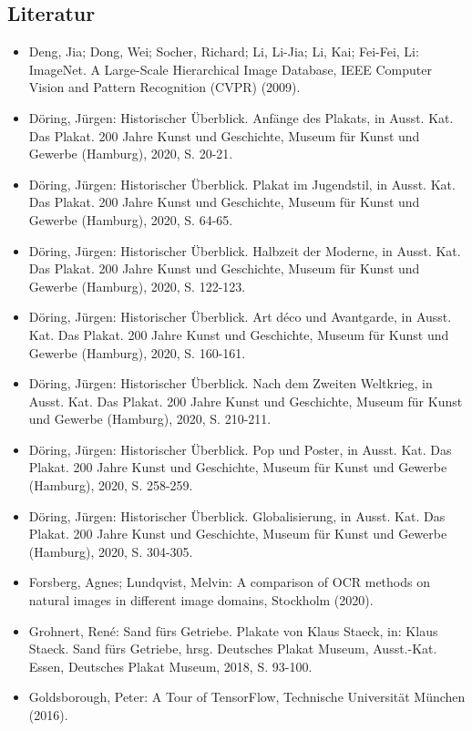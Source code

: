 \documentclass[a4paper,12pt,ngerman]{article}
\begin{document}
\subsection{Literatur}

\begin{itemize}
\item Deng, Jia; Dong, Wei; Socher, Richard; Li, Li-Jia; Li, Kai; Fei-Fei, Li: ImageNet. A Large-Scale Hierarchical Image Database, IEEE Computer Vision and Pattern Recognition (CVPR) (2009).
\item Döring, Jürgen: Historischer Überblick. Anfänge des Plakats, in Ausst. Kat. Das Plakat. 200 Jahre Kunst und Geschichte, Museum für Kunst und Gewerbe (Hamburg), 2020, S. 20-21.
\item Döring, Jürgen: Historischer Überblick. Plakat im Jugendstil, in Ausst. Kat. Das Plakat. 200 Jahre Kunst und Geschichte, Museum für Kunst und Gewerbe (Hamburg), 2020, S. 64-65.
\item Döring, Jürgen: Historischer Überblick. Halbzeit der Moderne, in Ausst. Kat. Das Plakat. 200 Jahre Kunst und Geschichte, Museum für Kunst und Gewerbe (Hamburg), 2020, S. 122-123.
\item Döring, Jürgen: Historischer Überblick. Art déco und Avantgarde, in Ausst. Kat. Das Plakat. 200 Jahre Kunst und Geschichte, Museum für Kunst und Gewerbe (Hamburg), 2020, S. 160-161.
\item Döring, Jürgen: Historischer Überblick. Nach dem Zweiten Weltkrieg, in Ausst. Kat. Das Plakat. 200 Jahre Kunst und Geschichte, Museum für Kunst und Gewerbe (Hamburg), 2020, S. 210-211.
\item Döring, Jürgen: Historischer Überblick. Pop und Poster, in Ausst. Kat. Das Plakat. 200 Jahre Kunst und Geschichte, Museum für Kunst und Gewerbe (Hamburg), 2020, S. 258-259.
\item Döring, Jürgen: Historischer Überblick. Globalisierung, in Ausst. Kat. Das Plakat. 200 Jahre Kunst und Geschichte, Museum für Kunst und Gewerbe (Hamburg), 2020, S. 304-305.
\item Forsberg, Agnes; Lundqvist, Melvin: A comparison of OCR methods on natural images in different image domains, Stockholm (2020).
\item Grohnert, René: Sand fürs Getriebe. Plakate von Klaus Staeck, in: Klaus Staeck. Sand fürs Getriebe, hrsg. Deutsches Plakat Museum, Ausst.-Kat. Essen, Deutsches Plakat Museum, 2018, S. 93-100.
\item Goldsborough, Peter: A Tour of TensorFlow, Technische Universität München (2016).

\end{itemize}
\end{document}
